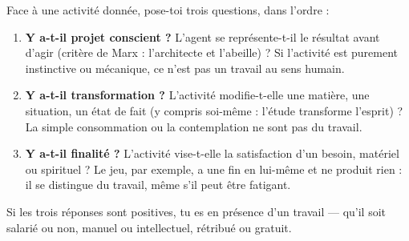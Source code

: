 \documentclass[11pt]{article}
\begin{document}
\begin{methode}
Face à une activité donnée, pose-toi trois questions, dans l'ordre :
\begin{enumerate}
\item \textbf{Y a-t-il projet conscient ?} L'agent se représente-t-il le résultat avant d'agir (critère de Marx : l'architecte et l'abeille) ? Si l'activité est purement instinctive ou mécanique, ce n'est pas un travail au sens humain.
\item \textbf{Y a-t-il transformation ?} L'activité modifie-t-elle une matière, une situation, un état de fait (y compris soi-même : l'étude transforme l'esprit) ? La simple consommation ou la contemplation ne sont pas du travail.
\item \textbf{Y a-t-il finalité ?} L'activité vise-t-elle la satisfaction d'un besoin, matériel ou spirituel ? Le jeu, par exemple, a une fin en lui-même et ne produit rien : il se distingue du travail, même s'il peut être fatigant.
\end{enumerate}
Si les trois réponses sont positives, tu es en présence d'un travail — qu'il soit salarié ou non, manuel ou intellectuel, rétribué ou gratuit.
\end{methode}
\end{document}
